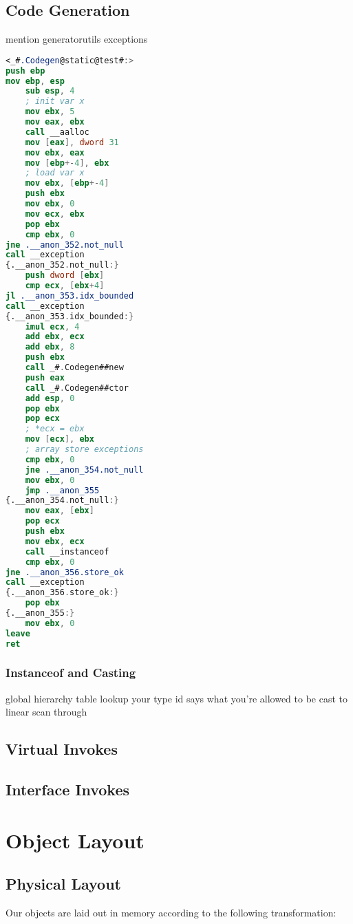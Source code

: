 \documentclass{article}
\begin{document}
\subsection{Code Generation}
mention generatorutils
exceptions

\begin{lstlisting}[language=nasm]
<_#.Codegen@static@test#:>
push ebp
mov ebp, esp
    sub esp, 4
    ; init var x
    mov ebx, 5
    mov eax, ebx
    call __aalloc
    mov [eax], dword 31
    mov ebx, eax
    mov [ebp+-4], ebx
    ; load var x
    mov ebx, [ebp+-4]
    push ebx
    mov ebx, 0
    mov ecx, ebx
    pop ebx
    cmp ebx, 0
jne .__anon_352.not_null
call __exception
{.__anon_352.not_null:}
    push dword [ebx]
    cmp ecx, [ebx+4]
jl .__anon_353.idx_bounded
call __exception
{.__anon_353.idx_bounded:}
    imul ecx, 4
    add ebx, ecx
    add ebx, 8
    push ebx
    call _#.Codegen##new
    push eax
    call _#.Codegen##ctor
    add esp, 0
    pop ebx
    pop ecx
    ; *ecx = ebx
    mov [ecx], ebx
    ; array store exceptions
    cmp ebx, 0
    jne .__anon_354.not_null
    mov ebx, 0
    jmp .__anon_355
{.__anon_354.not_null:}
    mov eax, [ebx]
    pop ecx
    push ebx
    mov ebx, ecx
    call __instanceof
    cmp ebx, 0
jne .__anon_356.store_ok
call __exception
{.__anon_356.store_ok:}
    pop ebx
{.__anon_355:}
    mov ebx, 0
leave
ret
\end{lstlisting}


\subsubsection{Instanceof and Casting}
global hierarchy table
lookup your type id
says what you're allowed to be cast to
linear scan through


\subsection{Virtual Invokes}

\subsection{Interface Invokes}


\section{Object Layout}
\subsection{Physical Layout}
Our objects are laid out in memory according to the following transformation:
\end{document}
